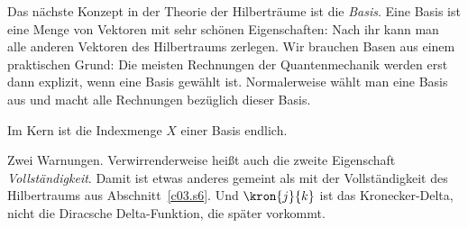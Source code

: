Das nächste Konzept in der Theorie der Hilberträume ist die \emph{Basis}. Eine Basis ist eine
Menge von Vektoren mit sehr schönen Eigenschaften: Nach ihr kann man alle anderen Vektoren des
Hilbertraums zerlegen. Wir brauchen Basen aus einem praktischen Grund: Die meisten Rechnungen
der Quantenmechanik werden erst dann explizit, wenn eine Basis gewählt ist. Normalerweise
wählt man eine Basis aus und macht alle Rechnungen bezüglich dieser Basis.

Im Kern ist die Indexmenge $X$ einer Basis endlich.


Zwei Warnungen. Verwirrenderweise heißt auch die zweite Eigenschaft \emph{Vollständigkeit}.
Damit ist etwas anderes gemeint als mit der Vollständigkeit des Hilbertraums aus
Abschnitt~\ref{c03.s6}. Und
$\kron{j}{k}$ ist das Kronecker-Delta, nicht die Diracsche Delta-Funktion, die später
vorkommt.

